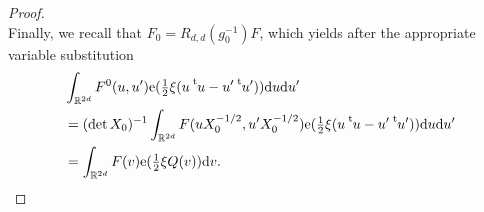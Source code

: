 \documentclass[10pt,a4paper]{amsart}
\newcommand{\dd}{\mathrm{d}}
\newcommand{\e}{\mathrm{e}}
\newcommand*{\transp}[2][-1mu]{\ensuremath{\mskip1mu\prescript{\smash{\mathrm t\mkern#1}}{}{\mathstrut#2}}}
\begin{document}
\begin{proof}
\begin{equation}
\end{equation}
Finally, we recall that $F_0=R_{d,d}(g_0^{-1}) F$, which yields after the appropriate variable substitution
\begin{equation}
\begin{split}
 & \int_{\mathbb{R}^{2d}} F^0(u,u') \e( \tfrac{1}{2} \xi (u\transp{u}-u'\transp{u}') ) \dd u \dd u' \\
& = (\det X_0)^{-1} \int_{\mathbb{R}^{2d}} F(u X_0^{-1/2},u' X_0^{-1/2}) \e( \tfrac{1}{2} \xi (u\transp{u}-u'\transp{u}') ) \dd u \dd u' \\
& = \int_{\mathbb{R}^{2d}} F(v) \e( \tfrac{1}{2} \xi Q(v) ) \dd v.
\end{split}
\end{equation}
 
\end{proof}
\end{document}
